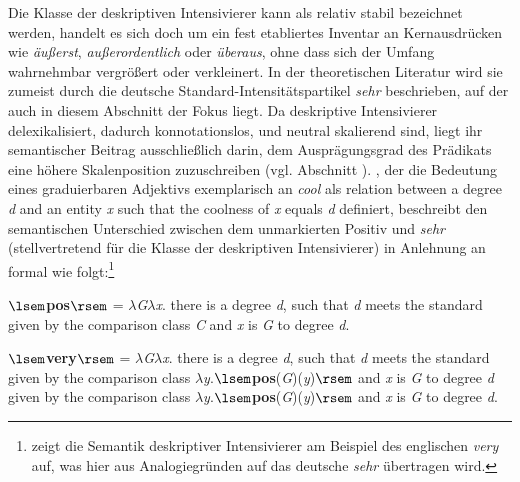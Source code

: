 \largerpage

Die Klasse der deskriptiven Intensivierer kann als relativ stabil bezeichnet werden, handelt es sich doch um ein fest etabliertes Inventar an Kernausdrücken wie \textit{äußerst}, \textit{außerordentlich} oder \textit{überaus}, ohne dass sich der Umfang wahrnehmbar vergrößert oder verkleinert. In der theoretischen Literatur wird sie zumeist durch die deutsche Standard-Intensitätspartikel \textit{sehr} beschrieben, auf der auch in diesem Abschnitt der Fokus liegt. Da deskriptive Intensivierer delexikalisiert, dadurch konnotationslos, und neutral skalierend sind, liegt ihr semantischer Beitrag ausschließlich darin, dem Ausprägungsgrad des Prädikats eine höhere Skalenposition zuzuschreiben (vgl. Abschnitt {}).  \citet[132f.]{Gutzmann.2019a}, der die Bedeutung eines graduierbaren Adjektivs exemplarisch an \textit{cool} als \glqq{}relation between a {degree \textit{d}} and an {entity \textit{x}} such that the coolness of \textit{x} equals \textit{d}\grqq{} definiert, beschreibt den semantischen Unterschied zwischen dem unmarkierten Positiv und \textit{sehr} (stellvertretend für die Klasse der deskriptiven Intensivierer) in Anlehnung an {\citet[370]{Kennedy.2005}} formal wie folgt:\footnote{\citet[133]{Gutzmann.2019a} zeigt die Semantik deskriptiver Intensivierer am Beispiel des englischen \textit{very} auf, was hier aus Analogiegründen auf das deutsche \textit{sehr} übertragen wird.}  \medskip

\noindent
$\lsem$\textbf{pos}$\rsem$ = $\lambda$\textit{G}$\lambda$\textit{x}. there is a degree \textit{d}, such that \textit{d} meets the standard given by
the comparison class \textit{C} and \textit{x} is \textit{G} to degree \textit{d}. \medskip

\noindent
$\lsem$\textbf{very}$\rsem$ = $\lambda$\textit{G}$\lambda$\textit{x}. there is a degree \textit{d}, such that \textit{d} meets the standard given by
the comparison class $\lambda$\textit{y}.$\lsem$\textbf{pos}(\textit{G})(\textit{y})$\rsem$ and \textit{x} is \textit{G} to degree \textit{d}
given by the comparison class $\lambda$\textit{y}.$\lsem$\textbf{pos}(\textit{G})(\textit{y})$\rsem$ and \textit{x} is \textit{G} to degree \textit{d}. 
\medskip

